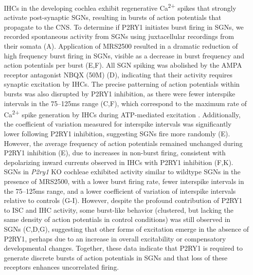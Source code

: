 \documentclass[9pt,lineno]{elife}
\begin{document}
IHCs in the developing cochlea exhibit regenerative Ca\textsuperscript{2+} spikes that strongly activate post-synaptic SGNs, resulting in bursts of action potentials that propagate to the CNS. To determine if P2RY1 initiates burst firing in SGNs, we recorded spontaneous activity from SGNs using juxtacellular recordings from their somata (A). Application of MRS2500 resulted in a dramatic reduction of high frequency burst firing in SGNs, visible as a decrease in burst frequency and action potentials per burst (E,F). All SGN spiking was abolished by the AMPA receptor antagonist NBQX (50\textmu M) (D), indicating that their activity requires synaptic excitation by IHCs. The precise patterning of action potentials within bursts was also disrupted by P2RY1 inhibition, as there were fewer interspike intervals in the 75--125ms range (C,F), which correspond to the maximum rate of Ca\textsuperscript{2+} spike generation by IHCs during ATP-mediated excitation \citep{Tritsch2010a}. Additionally, the coefficient of variation measured for interspike intervals was significantly lower following P2RY1 inhibition, suggesting SGNs fire more randomly (E). However, the average frequency of action potentials remained unchanged during P2RY1 inhibition (E), due to increases in non-burst firing, consistent with depolarizing inward currents observed in IHCs with P2RY1 inhibition (F,K). SGNs in \textit{P2ry1} KO cochleae exhibited activity similar to wildtype SGNs in the presence of MRS2500, with a lower burst firing rate, fewer interspike intervals in the 75--125ms  range,  and a lower coefficient of variation of interspike intervals relative to controls  (G-I). However, despite the profound contribution of P2RY1 to ISC and IHC activity, some burst-like behavior (clustered, but lacking the same density of action potentials in control conditions) was still observed in SGNs (C,D,G), suggesting that other forms of excitation emerge in the absence of P2RY1, perhaps due to an increase in overall excitability or compensatory developmental changes. Together, these data indicate that P2RY1 is required to generate discrete bursts of action potentials in SGNs and that loss of these receptors enhances uncorrelated firing.
\end{document}
